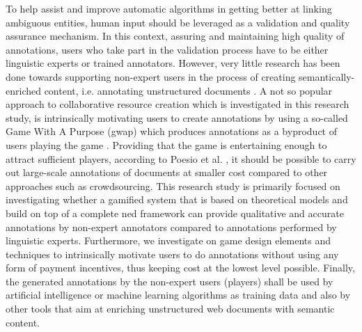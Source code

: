 To help assist and improve automatic algorithms in getting better at linking ambiguous entities, human input should be leveraged as a validation and quality assurance mechanism. In this context, assuring and maintaining high quality of annotations, users who take part in the validation process have to be either linguistic experts or trained annotators. However, very little research has been done towards supporting non-expert users in the process of creating semantically-enriched content, i.e. annotating unstructured documents \cite{15}. A not so popular approach to collaborative resource creation which is investigated in this research study, is intrinsically motivating users to create annotations by using a so-called Game With A Purpose (\ac{gwap}) which produces annotations as a byproduct of users playing the game \cite{vonahn}. Providing that the game is entertaining enough to attract sufficient players, according to Poesio et al. \cite{44}, it should be possible to carry out large-scale annotations of documents at smaller cost compared to other approaches such as crowdsourcing. This research study is primarily focused on investigating whether a gamified system that is based on theoretical models and build on top of a complete \ac{ned} framework can provide qualitative and accurate annotations by non-expert annotators compared to annotations performed by linguistic experts. Furthermore, we investigate on game design elements and techniques to intrinsically motivate users to do annotations without using any form of payment incentives, thus keeping cost at the lowest level possible. Finally, the generated annotations by the non-expert users (players) shall be used by artificial intelligence or machine learning algorithms as training data and also by other tools that aim at enriching unstructured web documents with semantic content.